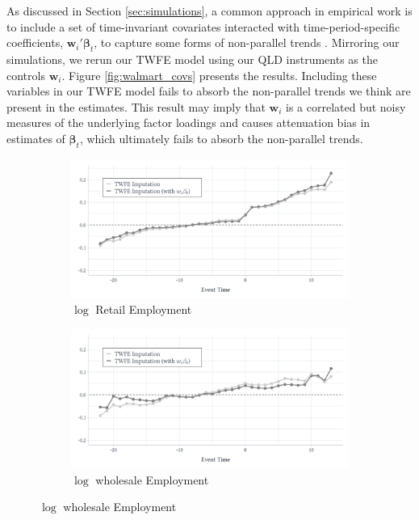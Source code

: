 \documentclass[12pt]{article}
\begin{document}
As discussed in Section \ref{sec:simulations}, a common approach in empirical work is to include a set of time-invariant covariates interacted with time-period-specific coefficients, $\bm w_i' \bm \beta_t$, to capture some forms of non-parallel trends \citep{abadie2005semiparametric, sant2020doubly}. Mirroring our simulations, we rerun our TWFE model using our QLD instruments as the controls $\bm w_i$. Figure \ref{fig:walmart_covs} presents the results. Including these variables in our TWFE model fails to absorb the non-parallel trends we think are present in the estimates. This result may imply that $\bm w_i$ is a correlated but noisy measures of the underlying factor loadings and causes attenuation bias in estimates of $\bm \beta_t$, which ultimately fails to absorb the non-parallel trends. 

\begin{figure}
\caption{Time-interacted covariates in TWFE model}
\label{fig:walmart_covs}

\begin{center}
\begin{subfigure}[b]{0.75\textwidth}
  \caption{$\log$ Retail Employment}
  \begin{adjustbox}{width=\textwidth, center}
    \includegraphics{figures/Walmart/retail_covs.pdf}
  \end{adjustbox}
\end{subfigure} 
\end{center}

\begin{center}
\begin{subfigure}[b]{0.75\textwidth}
  \caption{$\log$ wholesale Employment}
  \begin{adjustbox}{width=\textwidth, center}
    \includegraphics{figures/Walmart/wholesale_covs.pdf} 
  \end{adjustbox}
\end{subfigure}
\end{center}


\end{figure}
\end{document}
